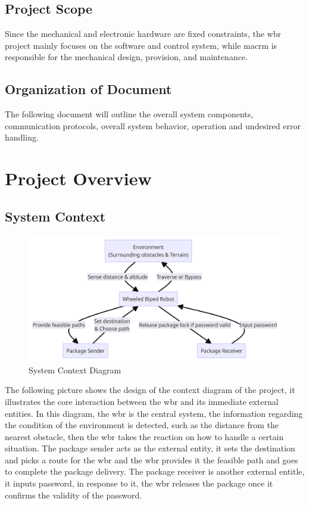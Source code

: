 \documentclass[12pt]{article}
\begin{document}
\subsection{Project Scope}
Since the mechanical and electronic hardware are fixed constraints, the \acrshort{wbr} project mainly focuses on the software and control system, while \acrshort{macrm} is responsible for the mechanical design, provision, and maintenance.

\subsection{Organization of Document}
The following document will outline the overall system components, communication protocols, overall system behavior, operation and undesired error handling.

\section{Project Overview}
\subsection{System Context}
\begin{figure}[H]
    \centering
    \includegraphics[width=\textwidth,height=\textheight,keepaspectratio]{../System Context Diagram.png}
    \caption{System Context Diagram}
\end{figure}
The following picture shows the design of the context diagram of the project, it illustrates the core interaction between the \acrshort{wbr} and its immediate external entities. In this diagram, the \acrshort{wbr} is the central system, the information regarding the condition of the environment is detected, such as the distance from the nearest obstacle, then the \acrshort{wbr} takes the reaction on how to handle a certain situation. The package sender acts as the external entity, it sets the destination and picks a route for the \acrshort{wbr} and the \acrshort{wbr} provides it the feasible path and goes to complete the package delivery. The package receiver is another external entitle, it inputs password, in response to it, the \acrshort{wbr} releases the package once it confirms the validity of the password.
\end{document}
